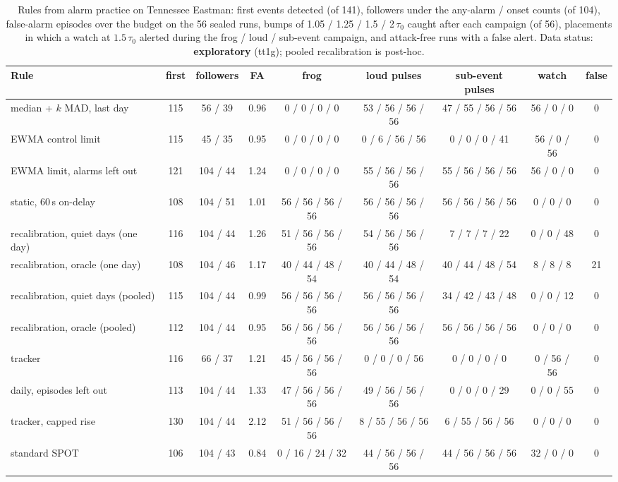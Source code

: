 \documentclass[letterpaper,twocolumn,10pt]{article}
\begin{document}
\begin{table}[t]
\caption{Rules from alarm practice on Tennessee Eastman: first events detected (of 141), followers
under the any-alarm / onset counts (of 104), false-alarm episodes over the budget on the 56 sealed runs,
bumps of 1.05 / 1.25 / 1.5 / 2\,$\tau_0$ caught after each campaign (of 56), placements in which a watch at
$1.5\,\tau_0$ alerted during the frog / loud / sub-event campaign, and attack-free runs with a false
alert. Data status: \textbf{exploratory} (tt1g); pooled recalibration is post-hoc.}
\label{tab:practice}
\small
\begin{tabularx}{\textwidth}{@{}Lcccccccc@{}}
\toprule
Rule & first & followers & FA & frog & loud pulses & sub-event pulses & watch & false \\
\midrule
median + $k$ MAD, last day & 115 & 56 / 39 & 0.96 & 0 / 0 / 0 / 0 & 53 / 56 / 56 / 56 & 47 / 55 / 56 / 56 & 56 / 0 / 0 & 0 \\
EWMA control limit & 115 & 45 / 35 & 0.95 & 0 / 0 / 0 / 0 & 0 / 6 / 56 / 56 & 0 / 0 / 0 / 41 & 56 / 0 / 56 & 0 \\
EWMA limit, alarms left out & 121 & 104 / 44 & 1.24 & 0 / 0 / 0 / 0 & 55 / 56 / 56 / 56 & 55 / 56 / 56 / 56 & 56 / 0 / 0 & 0 \\
static, 60\,s on-delay & 108 & 104 / 51 & 1.01 & 56 / 56 / 56 / 56 & 56 / 56 / 56 / 56 & 56 / 56 / 56 / 56 & 0 / 0 / 0 & 0 \\
recalibration, quiet days (one day) & 116 & 104 / 44 & 1.26 & 51 / 56 / 56 / 56 & 54 / 56 / 56 / 56 & 7 / 7 / 7 / 22 & 0 / 0 / 48 & 0 \\
recalibration, oracle (one day) & 108 & 104 / 46 & 1.17 & 40 / 44 / 48 / 54 & 40 / 44 / 48 / 54 & 40 / 44 / 48 / 54 & 8 / 8 / 8 & 21 \\
recalibration, quiet days (pooled) & 115 & 104 / 44 & 0.99 & 56 / 56 / 56 / 56 & 56 / 56 / 56 / 56 & 34 / 42 / 43 / 48 & 0 / 0 / 12 & 0 \\
recalibration, oracle (pooled) & 112 & 104 / 44 & 0.95 & 56 / 56 / 56 / 56 & 56 / 56 / 56 / 56 & 56 / 56 / 56 / 56 & 0 / 0 / 0 & 0 \\
tracker & 116 & 66 / 37 & 1.21 & 45 / 56 / 56 / 56 & 0 / 0 / 0 / 56 & 0 / 0 / 0 / 0 & 0 / 56 / 56 & 0 \\
daily, episodes left out & 113 & 104 / 44 & 1.33 & 47 / 56 / 56 / 56 & 49 / 56 / 56 / 56 & 0 / 0 / 0 / 29 & 0 / 0 / 55 & 0 \\
tracker, capped rise & 130 & 104 / 44 & 2.12 & 51 / 56 / 56 / 56 & 8 / 55 / 56 / 56 & 6 / 55 / 56 / 56 & 0 / 0 / 0 & 0 \\
standard SPOT & 106 & 104 / 43 & 0.84 & 0 / 16 / 24 / 32 & 44 / 56 / 56 / 56 & 44 / 56 / 56 / 56 & 32 / 0 / 0 & 0 \\
\bottomrule
\end{tabularx}
\end{table}
\end{document}
